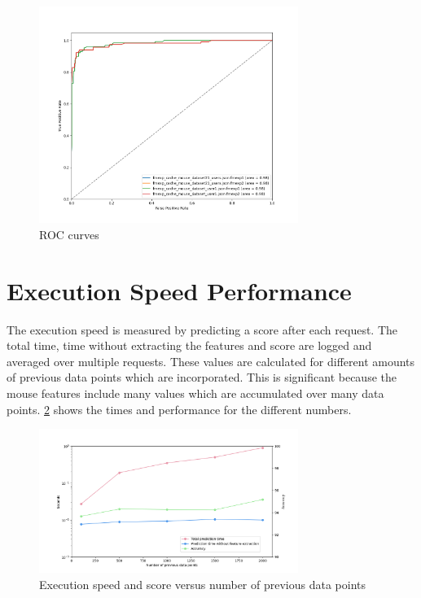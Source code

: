 \documentclass[
    fontsize=12pt,
    headings=small,
    parskip=half,           %
    bibliography=totoc,
    numbers=noenddot,       %
    open=any,               %
    final                   %
]{scrreprt}
\begin{document}
\begin{figure}[h]
	\includegraphics[width=0.75\textwidth]{figures/roc_both_datasets_both_instances.png}
	\caption{ROC curves}
	\label{fig:roc_both_datasets_both_instances}
\end{figure}


\section{Execution Speed Performance}

The execution speed is measured by predicting a score after each request. The total time, time without extracting the features and score are logged and averaged over multiple requests. These values are calculated for different amounts of previous data points which are incorporated. This is significant because the mouse features include many values which are accumulated over many data points. \ref{fig:speed_per_dp_count} shows the times and performance for the different numbers.

\begin{figure}[h]
	\includegraphics[width=0.75\textwidth]{figures/speed_per_dp_count.png}
	\caption{Execution speed and score versus number of previous data points}
	\label{fig:speed_per_dp_count}
\end{figure}
\end{document}
